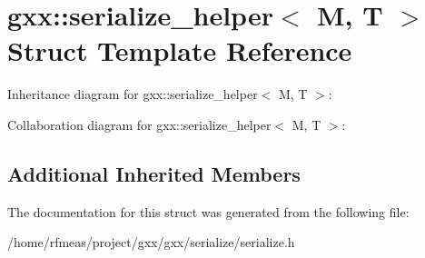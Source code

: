 \hypertarget{structgxx_1_1serialize__helper}{}\section{gxx\+:\+:serialize\+\_\+helper$<$ M, T $>$ Struct Template Reference}
\label{structgxx_1_1serialize__helper}


Inheritance diagram for gxx\+:\+:serialize\+\_\+helper$<$ M, T $>$\+:


Collaboration diagram for gxx\+:\+:serialize\+\_\+helper$<$ M, T $>$\+:
\subsection*{Additional Inherited Members}


The documentation for this struct was generated from the following file\+:\begin{DoxyCompactItemize}
\item 
/home/rfmeas/project/gxx/gxx/serialize/serialize.\+h\end{DoxyCompactItemize}
